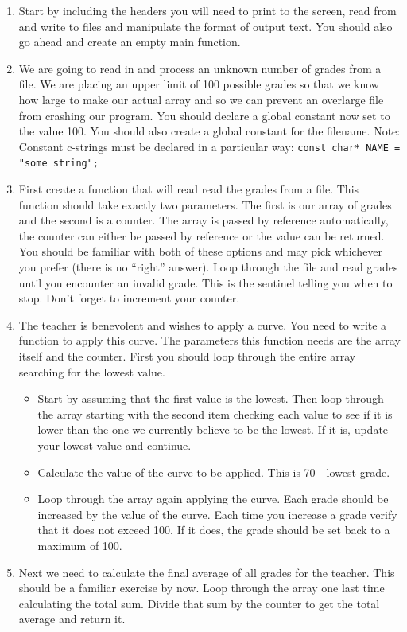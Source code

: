 \documentclass[letterpaper,12pt]{article}
\begin{document}
\begin{enumerate}
	\item Start by including the headers you will need to print to the screen, read from
		and write to files and manipulate the format of output text. You should also go ahead
		and create an empty main function.
	\item We are going to read in and process an unknown number of grades from a file. We are
		placing an upper limit of 100 possible grades so that we know how large to make our 
		actual array and so we can prevent an overlarge file from crashing our program. You
		should declare a global constant now set to the value 100. You should also create a 
		global constant for the filename. Note: Constant c-strings must be declared in a particular
		way: \lstinline$const char* NAME = "some string";$
	\item First create a function that will read read the grades from a file. This function
		should take exactly two parameters.  The first is our array of grades and the second
		is a counter. The array is passed by reference automatically, the counter can either
		be passed by reference or the value can be returned. You should be familiar with both
		of these options and may pick whichever you prefer (there is no ``right'' answer). Loop
		through the file and read grades until you encounter an invalid grade. This is the 
		sentinel telling you when to stop. Don't forget to increment your counter.
	\item The teacher is benevolent and wishes to apply a curve. You need to write a function to
		apply this curve. The parameters this function needs are the array itself and the counter. 
		First you should loop through the entire array searching for the lowest value.  
		\begin{itemize}
			\item Start by assuming that the first value is the lowest. Then loop through the array
				starting with the second item checking each value to see if it is lower than the one
				we currently believe to be the lowest. If it is, update your lowest value and continue.
			\item Calculate the value of the curve to be applied.  This is 70 - lowest grade.
			\item Loop through the array again applying the curve. Each grade should be increased by
				the value of the curve. Each time you increase a grade verify that it does not exceed 
				100.  If it does, the grade should be set back to a maximum of 100.
		\end{itemize}
	\item Next we need to calculate the final average of all grades for the teacher.
		This should be a familiar exercise by now. Loop through the array one last time calculating 
		the total sum. Divide that sum by the counter to get the total average and return it.


\end{enumerate}
\end{document}
